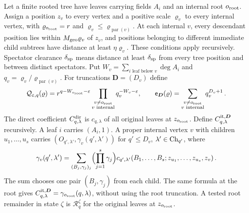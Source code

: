 \begin{definition}\label{def:nested-clusters}
Let a finite rooted tree have leaves carrying fields $A_i$ and an internal root $o_{\rm root}$. Assign a position $z_v$ to every vertex and a positive scale $\varrho_v$ to every internal vertex, with $\varrho_{o_{\rm root}}=r$ and $\varrho_v\le\varrho_{\operatorname{par}(v)}$. At each internal $v$, every descendant position lies within $M_{\rm geo}\varrho_v$ of $z_v$, and positions belonging to different immediate child subtrees have distance at least $\eta\varrho_v$. These conditions apply recursively. Spectator clearance $\delta_{\rm sp}$ means distance at least $\delta_{\rm sp}$ from every tree position and between distinct spectators. Put $W_v=\sum_{i\text{ leaf below }v}\deg A_i$ and $q_v=\varrho_v/\varrho_{\operatorname{par}(v)}$. For truncations $\boldsymbol D=(D_v)$ define
\begin{equation}\label{eq:nested-rates}
\mathcal Q_{\varepsilon,q}(\varrho)=r^{q-W_{o_{\rm root}}-\varepsilon}\prod_{\substack{v\ne o_{\rm root}\\v\text{ internal}}}q_v^{-W_v-\varepsilon},\qquad \mathsf e_{\boldsymbol D}(\varrho)=\sum_{\substack{v\ne o_{\rm root}\\v\text{ internal}}}q_v^{D_v+1}\,.
\end{equation}
The direct coefficient $C^{\rm dir}_{q,\lambda}$ is $c_{q,\lambda}$ of all original leaves at $z_{o_{\rm root}}$. Define $C^{\rm it,\boldsymbol D}_{q,\lambda}$ recursively. A leaf $i$ carries $(A_i,1)$. A proper internal vertex $v$ with children $u_1,\ldots,u_s$ carries $(O_{q',\lambda'},\gamma_v(q',\lambda'))$ for $q'\le D_v$, $\lambda'\in\mathrm{Ch}_{q'}$, where
\begin{equation}\label{eq:iterated-coefficient}
\gamma_v(q',\lambda')=\sum_{(B_j,\gamma_j)_j}\Bigl(\prod_{j=1}^s\gamma_j\Bigr)c_{q',\lambda'}(B_1,\ldots,B_s;z_{u_1},\ldots,z_{u_s},z_v)\,.
\end{equation}
The sum chooses one pair $(B_j,\gamma_j)$ from each child. The same formula at the root gives $C^{\rm it,\boldsymbol D}_{q,\lambda}=\gamma_{o_{\rm root}}(q,\lambda)$, without using the root truncation. A tested root remainder in state $\zeta$ is $\mathcal R_q^\zeta$ for the original leaves at $z_{o_{\rm root}}$.
\end{definition}

